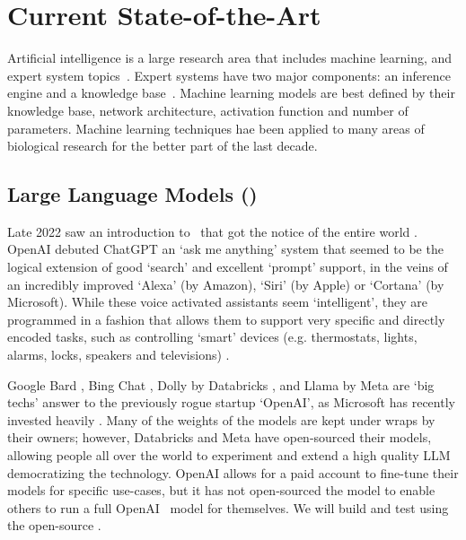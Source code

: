 \section{Current State-of-the-Art}

Artificial intelligence is a large research area that includes machine learning, and expert system topics~\cite{RussellNorvig:2016}.
Expert systems have two major components: an inference engine and a knowledge base~\cite{Liao:2005,Tan:2017}.
Machine learning models are best defined by their knowledge base, network architecture, activation function and number of parameters.
Machine learning techniques hae been applied to many areas of biological research \cite{Deng:2011,Angermueller:2016,Gawehn:2016_deep,Min:2017,Miotto:2018:deep,Tran:2018,Toh:2019,Zhang:2019,Bouwmeester:2020,Wen:2020:deep,Caudai:2021,Talukder:2021,Hassabis:2022} for the better part of the last decade.

\subsection{Large Language Models (\llms)}
Late 2022 saw an introduction to \llms\ that got the notice of the entire world \cite{Schulman:2022_chatgptintro}.
OpenAI debuted ChatGPT an `ask me anything' system that seemed to be the logical extension of good `search' and excellent `prompt' support, in the veins of an incredibly improved `Alexa' (by Amazon), `Siri' (by Apple) or `Cortana' (by Microsoft).
While these voice activated assistants seem `intelligent', they are programmed in a fashion that allows them to support very specific and directly encoded tasks, such as controlling `smart' devices (e.g. thermostats, lights, alarms, locks, speakers and televisions) \cite{Hoy:2018}.

Google Bard \cite{GoogleBard:2023}, Bing Chat \cite{BingChat:2023}, Dolly by Databricks \cite{Dolly:2023}, and Llama by Meta \cite{Llama:2023,Llama2:2023} are `big techs' answer to the previously rogue startup `OpenAI', as Microsoft has recently invested heavily \cite{Browne:2023}.
Many of the weights of the models are kept under wraps by their owners; however, Databricks and Meta have open-sourced their models, allowing people all over the world to experiment and extend a high quality LLM democratizing the technology.
OpenAI allows for a paid account to fine-tune their models for specific use-cases, but it has not open-sourced the model to enable others to run a full OpenAI \gpts\ model for themselves.
We will build and test using the open-source \llms.


